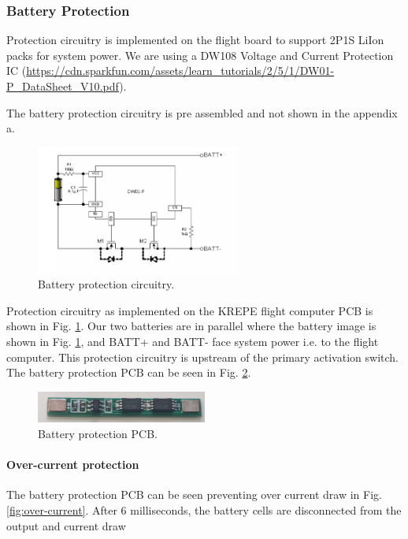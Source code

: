 \documentclass{article}
\begin{document}
\subsubsection{Battery Protection}
Protection circuitry is implemented on the flight board to support 2P1S LiIon packs for system power. We are using a DW108 Voltage and Current Protection IC (\url{https://cdn.sparkfun.com/assets/learn_tutorials/2/5/1/DW01-P_DataSheet_V10.pdf}).

The battery protection circuitry is pre assembled and not shown in the appendix a.

\begin{figure}[H]
	\centering
	\includegraphics[width=0.6\textwidth]{images/dw108.png}
	\caption{Battery protection circuitry.}
	\label{fig:bat-protec}
\end{figure}



Protection circuitry as implemented on the KREPE flight computer PCB is shown in Fig. \ref{fig:bat-protec}. Our two batteries are in parallel where the battery image is shown in Fig. \ref{fig:bat-protec}, and BATT+ and BATT- face system power i.e. to the flight computer. This protection circuitry is upstream of the primary activation switch. The battery protection PCB can be seen in Fig. \ref{fig:bat-protect}.


\begin{figure}[H]
	\centering
	\includegraphics[width=0.5\textwidth]{images/new_batt_prot.png}
	\caption{Battery protection PCB.}
	\label{fig:bat-protect}
\end{figure}


\paragraph{Over-current protection}
The battery protection PCB can be seen preventing over current draw in Fig. \ref{fig:over-current}. After 6 milliseconds, the battery cells are disconnected from the output and current draw 
\end{document}
